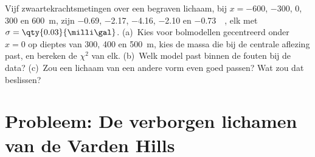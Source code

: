 \begin{exercise}[$\star\star\star$]\label{exo:b3:field-lab-methods-3:12}
Vijf zwaartekrachtsmetingen over een begraven lichaam, bij $x = -600$, $-300$, $0$,
$300$ en \qty{600}{m}, zijn \num{-0.69}, \num{-2.17}, \num{-4.16},
\num{-2.10} en \qty{-0.73}{\milli\gal}, elk met $\sigma =
\qty{0.03}{\milli\gal}$. (a)~Kies voor bolmodellen gecentreerd onder $x = 0$ op
dieptes van \num{300}, \num{400} en \qty{500}{m}, kies de massa die bij de
centrale aflezing past, en bereken de  $\chi^2$ van elk. (b)~Welk
model past binnen de fouten bij de data? (c)~Zou een lichaam van een andere
vorm even goed passen? Wat zou dat beslissen?
\end{exercise}

\section{Probleem: De verborgen lichamen van de Varden Hills}

